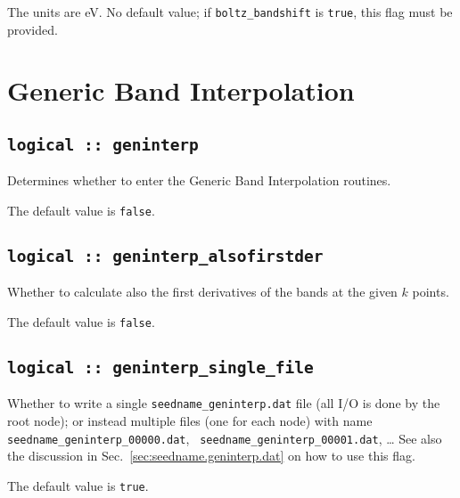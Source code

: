 The units are eV.
No default value; if {\tt boltz\_bandshift} is \verb#true#, this flag must be provided.


\section{Generic Band Interpolation}
\subsection[boltzwann]{\tt logical :: geninterp}
Determines whether to enter the Generic Band Interpolation routines.

The default value is \verb#false#.

\subsection[geninterp\_alsofirstder]{\tt logical :: geninterp\_alsofirstder}
Whether to calculate also the first derivatives of the bands at the
given $k$ points.

The default value is \verb#false#.

\subsection[geninterp\_alsofirstder]{\tt logical :: geninterp\_single\_file}
Whether to write a single  {\tt seedname\_geninterp.dat} file (all I/O is done by the root node); or
instead multiple files (one for each node) with
name {\tt seedname\_geninterp\_00000.dat}, {\tt
  seedname\_geninterp\_00001.dat}, \ldots
See also the discussion in Sec.~\ref{sec:seedname.geninterp.dat} on
how to use this flag.

The default value is \verb#true#.
